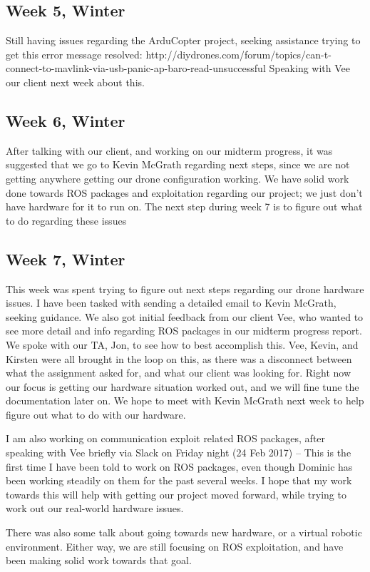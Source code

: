\documentclass[IEEEtran,letterpaper,10pt,notitlepage,draftclsnofoot,onecolumn]{article}
\begin{document}
\subsection{Week 5, Winter}
Still having issues regarding the ArduCopter project, seeking assistance trying to get this error message resolved: http://diydrones.com/forum/topics/can-t-connect-to-mavlink-via-usb-panic-ap-baro-read-unsuccessful Speaking with Vee our client next week about this.
\subsection{Week 6, Winter}
After talking with our client, and working on our midterm progress, it was suggested that we go to Kevin McGrath regarding next steps, since we are not getting anywhere getting our drone configuration working. We have solid work done towards ROS packages and exploitation regarding our project; we just don't have hardware for it to run on. The next step during week 7 is to figure out what to do regarding these issues
\subsection{Week 7, Winter}
This week was spent trying to figure out next steps regarding our drone hardware issues. I have been tasked with sending a detailed email to Kevin McGrath, seeking guidance. We also got initial feedback from our client Vee, who wanted to see more detail and info regarding ROS packages in our midterm progress report. We spoke with our TA, Jon, to see how to best accomplish this. Vee, Kevin, and Kirsten were all brought in the loop on this, as there was a disconnect between what the assignment asked for, and what our client was looking for. Right now our focus is getting our hardware situation worked out, and we will fine tune the documentation later on. We hope to meet with Kevin McGrath next week to help figure out what to do with our hardware.

I am also working on communication exploit related ROS packages, after speaking with Vee briefly via Slack on Friday night (24 Feb 2017) -- This is the first time I have been told to work on ROS packages, even though Dominic has been working steadily on them for the past several weeks. I hope that my work towards this will help with getting our project moved forward, while trying to work out our real-world hardware issues.

There was also some talk about going towards new hardware, or a virtual robotic environment. Either way, we are still focusing on ROS exploitation, and have been making solid work towards that goal.
\end{document}

